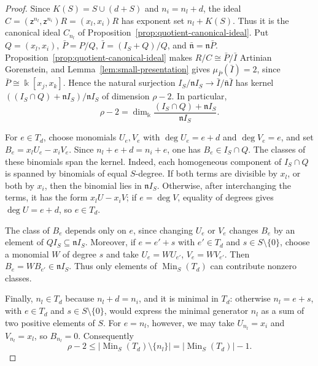 \documentclass[10pt]{amsart}
\theoremstyle{plain}
\begin{document}
\begin{proof}
Since \(K(S)=S\cup(d+S)\) and \(n_i=n_l+d\), the ideal
\(C=(\mathsf z^{n_l},\mathsf z^{n_i})R=(x_l,x_i)R\) has exponent set
\(n_l+K(S)\).  Thus it is the canonical ideal \(C_{n_l}\) of
Proposition~\ref{prop:quotient-canonical-ideal}.
Put \(Q=(x_l,x_i)\), \(\bar P=P/Q\),
\(\bar I=(I_S+Q)/Q\), and
\(\bar{\mathfrak n}=\mathfrak n\bar P\).
Proposition~\ref{prop:quotient-canonical-ideal} makes
\(R/C\cong\bar P/\bar I\) Artinian Gorenstein, and
Lemma~\ref{lem:small-presentation} gives \(\mu_{\bar P}(\bar I)=2\), since
\(\bar P\cong\Bbbk[x_j,x_k]\).
Hence the natural surjection
\(I_S/\mathfrak nI_S\to
\bar I/\bar{\mathfrak n}\bar I\)
has kernel
\(((I_S\cap Q)+\mathfrak nI_S)/\mathfrak nI_S\)
of dimension \(\rho-2\).  In particular,
\begin{equation}\label{eq:type2-relation-kernel}
\rho-2=
\dim_{\Bbbk}\frac{(I_S\cap Q)+\mathfrak nI_S}{\mathfrak nI_S}.
\end{equation}

For \(e\in T_d\), choose monomials \(U_e,V_e\) with
\(\deg U_e=e+d\) and \(\deg V_e=e\), and set
\(B_e=x_lU_e-x_iV_e\).
Since \(n_l+e+d=n_i+e\), one has \(B_e\in I_S\cap Q\).
The classes of these binomials span the kernel.  Indeed, each
homogeneous component of \(I_S\cap Q\) is spanned by binomials of
equal \(S\)-degree.  If both terms are divisible by \(x_l\), or both
by \(x_i\), then the binomial lies in \(\mathfrak nI_S\).
Otherwise, after interchanging the terms, it has the form
\(x_lU-x_iV\); if \(e=\deg V\), equality of degrees gives
\(\deg U=e+d\), so \(e\in T_d\).

The class of \(B_e\) depends only on \(e\), since changing \(U_e\) or
\(V_e\) changes \(B_e\) by an element of
\(QI_S\subseteq\mathfrak nI_S\).
Moreover, if \(e=e'+s\) with \(e'\in T_d\) and
\(s\in S\setminus\{0\}\), choose a monomial \(W\) of degree \(s\)
and take \(U_e=WU_{e'}\), \(V_e=WV_{e'}\).
Then \(B_e=WB_{e'}\in\mathfrak nI_S\).
Thus only elements of \(\operatorname{Min}_S(T_d)\) can contribute
nonzero classes.

Finally, \(n_l\in T_d\) because \(n_l+d=n_i\), and it is minimal in
\(T_d\): otherwise \(n_l=e+s\), with \(e\in T_d\) and
\(s\in S\setminus\{0\}\), would express the minimal generator \(n_l\)
as a sum of two positive elements of \(S\).
For \(e=n_l\), however, we may take
\(U_{n_l}=x_i\) and \(V_{n_l}=x_l\), so \(B_{n_l}=0\).
Consequently
\[
\rho-2\le
\bigl|\operatorname{Min}_S(T_d)\setminus\{n_l\}\bigr|
=|\operatorname{Min}_S(T_d)|-1.
\]
\end{proof}
\end{document}
